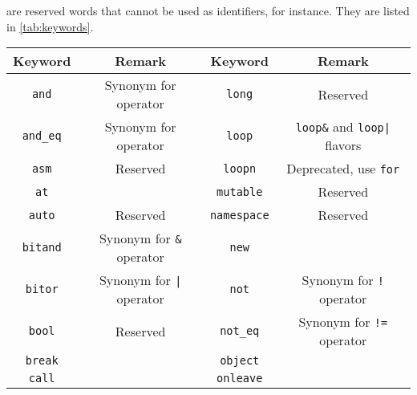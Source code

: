  are reserved words that cannot be used as identifiers,
for instance.  They are listed in \autoref{tab:keywords}.

\renewcommand{\baselinestretch}{.85}
\begin{table}[\floatpos]
  \centering
  \begin{tabular}{|c|c||c|c|}
    \hline
    Keyword                       & Remark                                  &
    Keyword                       & Remark                                  \\
    \hline
    \lstinline"and"               & Synonym for  operator                   &
    \lstinline"long"              & Reserved                                \\
    \lstinline"and_eq"            & Synonym for  operator                   &
    \lstinline"loop"              & \lstinline|loop&| and
                                    \lstinline-loop|- flavors               \\
    \lstinline"asm"               & Reserved                                &
    \lstinline"loopn"             & Deprecated, use \lstinline|for|         \\
    \lstinline"at"                &                                         &
    \lstinline"mutable"           & Reserved                                \\
    \lstinline"auto"              & Reserved                                &
    \lstinline"namespace"         & Reserved                                \\
    \lstinline"bitand"            & Synonym for \lstinline|&| operator      &
    \lstinline"new"               &                                         \\
    \lstinline"bitor"             & Synonym for \lstinline-|- operator      &
    \lstinline"not"               & Synonym for \lstinline|!| operator      \\
    \lstinline"bool"              & Reserved                                &
    \lstinline"not_eq"            & Synonym for \lstinline|!=| operator     \\
    \lstinline"break"             &                                         &
    \lstinline"object"            &                                         \\
    \lstinline"call"              &                                         &
    \lstinline"onleave"           &                                         \\

\end{tabular}
\end{table}

